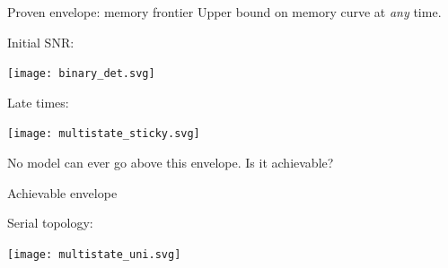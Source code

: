 \documentclass{beamer}%
\begin{document}
\begin{frame}{Proven envelope: memory frontier}
%
 Upper bound on memory curve at \emph{any} time.

\vp
\parbox[c]{0.55\linewidth}{
 \begin{center}
 \end{center}
}
\hspace{0.02\linewidth}
\parbox[c]{0.4\linewidth}{
   Initial SNR: %
   \begin{center}
     \texttt{[image: binary\_det.svg]}
   \end{center}

   \vp Late times: %
   \begin{center}
     \texttt{[image: multistate\_sticky.svg]}
   \end{center}
}


 \vp No model can ever go above this envelope.
 Is it achievable?
%
\end{frame}


\begin{frame}{Achievable envelope}
%
 \parbox[c]{0.67\linewidth}{
 }
 \parbox[c]{0.3\linewidth}{
   Serial topology:
   \begin{center}
     \texttt{[image: multistate\_uni.svg]}
   \end{center}
 }
%
\end{frame}


\end{document}
